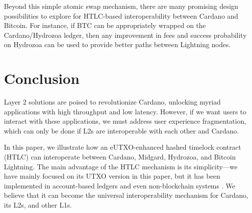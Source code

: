 \documentclass[11pt,a4paper,oneside]{article}
\begin{document}
\begin{multicols}{2}
Beyond this simple atomic swap mechanism, there are many promising design possibilities to explore for HTLC-based interoperability between Cardano and Bitcoin.
For instance, if BTC can be appropriately wrapped on the Cardano/Hydrozoa ledger, then any improvement in fees and success probability on Hydrozoa can be used to provide better paths between Lightning nodes.

\section{Conclusion}%
\label{h:conclusion}

Layer 2 solutions are poised to revolutionize Cardano, unlocking myriad applications with high throughput and low latency.
However, if we want users to interact with these applications, we must address user experience fragmentation, which can only be done if L2s are interoperable with each other and Cardano.

In this paper, we illustrate how an eUTXO-enhanced hashed timelock contract (HTLC) can interoperate between Cardano, Midgard, Hydrozoa, and Bitcoin Lightning.
The main advantage of the HTLC mechanism is its simplicity---we have mainly focused on its UTXO version in this paper, but it has been implemented in account-based ledgers and even non-blockchain systems \citep{InterledgerFoundationHashedTimelockAgreements2024}.
We believe that it can become the universal interoperability mechanism for Cardano, its L2s, and other L1s.

\end{multicols}



\raggedright

% 
\end{document}
